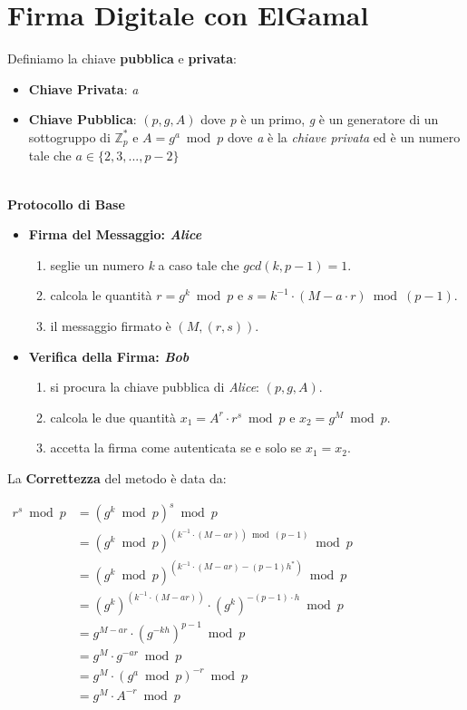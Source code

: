 \section{Firma Digitale con ElGamal}
Definiamo la chiave \textbf{pubblica} e \textbf{privata}:
\begin{itemize}
    \item \textbf{Chiave Privata}: \textit{a}
    \item \textbf{Chiave Pubblica}: $(p, g, A)$ dove \textit{p} è un primo, \textit{g} è un generatore di un sottogruppo di $\mathbb{Z}_p^*$ e $A = g^a \bmod p$ dove \textit{a} è la \textit{chiave privata} ed è un numero tale che $a \in \{2, 3, ..., p - 2\}$
\end{itemize}
\   \\
\textbf{Protocollo di Base}
\begin{itemize}
    \item \textbf{Firma del Messaggio: \textit{Alice}}
    \begin{enumerate}
        \item seglie un numero \textit{k} a caso tale che $gcd(k, p - 1) = 1$.
        \item calcola le quantità $r = g^k \bmod p$ e $s = k^{-1} \cdot (M - a \cdot r) \bmod (p -1)$.
        \item il messaggio firmato è $(M, (r, s))$.
    \end{enumerate}
    \item \textbf{Verifica della Firma: \textit{Bob}}
    \begin{enumerate}
        \item si procura la chiave pubblica di \textit{Alice}: $(p, g, A)$.
        \item calcola le due quantità $x_1 = A^r \cdot r^s \bmod p$ e $x_2 = g^M \bmod p$.
        \item accetta la firma come autenticata se e solo se $x_1 = x_2$.
    \end{enumerate}
\end{itemize}
La \textbf{Correttezza} del metodo è data da:
\begin{center}
    \begin{math}
        \begin{aligned}
            r^s \bmod p &= (g^k \bmod p)^s \bmod p \\
            &= (g^k \bmod p)^{(k^{-1} \cdot (M - ar)) \bmod (p - 1)} \bmod p \\
            &= (g^k \bmod p)^{(k^{-1} \cdot (M - ar) - (p - 1)h^*)} \bmod p \\
            &= (g^k)^{(k^{-1} \cdot (M - ar))} \cdot (g^k)^{-(p - 1) \cdot h} \bmod p\\
            &= g^{M - ar} \cdot (g^{-kh})^{p - 1} \bmod p \\
            &= g^M \cdot g^{-ar} \bmod p \\
            &= g^M \cdot (g^a \bmod p)^{-r} \bmod p \\
            &= g^M \cdot A^{-r} \bmod p 
        \end{aligned}
    \end{math}
\end{center}
